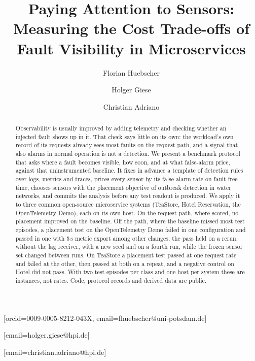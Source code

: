 \documentclass{ceurart}
\begin{document}


\title{Paying Attention to Sensors: Measuring the Cost Trade-offs of Fault Visibility in Microservices}

\author[1]{Florian Huebscher}[orcid=0009-0005-8212-043X,
  email=fhuebscher@uni-potsdam.de]
\author[1]{Holger Giese}[email=holger.giese@hpi.de]
\author[1]{Christian Adriano}[email=christian.adriano@hpi.de]
\address[1]{Hasso Plattner Institute, University of Potsdam, Potsdam, Germany}

\begin{abstract}
Observability is usually improved by adding telemetry and checking whether an injected fault shows up in it. That check
says little on its own: the workload's own record of its requests already sees most faults on the request path, and a
signal that also alarms in normal operation is not a detection. We present a benchmark protocol that asks where a fault
becomes visible, how soon, and at what false-alarm price, against that uninstrumented baseline. It fixes in advance a
template of detection rules over logs, metrics and traces, prices every sensor by its false-alarm rate on fault-free time,
chooses sensors with the placement objective of outbreak detection in water networks, and commits the analysis before any
test readout is produced. We apply it to three common open-source microservice systems (TeaStore, Hotel Reservation, the
OpenTelemetry Demo), each on its own host. On the request path, where scored, no placement improved on the baseline. Off the path, where
the baseline missed most test episodes, a placement test on the OpenTelemetry Demo failed in one configuration and passed in one with 5\,s
metric export among other changes; the pass held on a rerun, without the lag receiver, with a new seed and on a fourth run,
while the frozen sensor set changed between runs. On TeaStore a placement test passed at one request rate and failed at the other, then passed at both on
a repeat, and a negative control on Hotel did not pass. With two test episodes per class and one host per system these are instances, not rates.
Code, protocol records and derived data are public.
\end{abstract}
\end{document}
